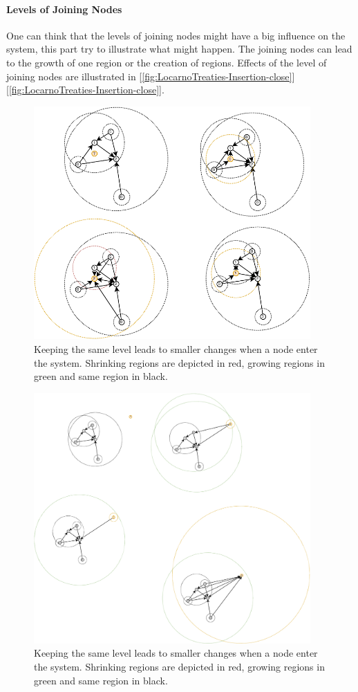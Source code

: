 \documentclass[a4paper,11pt,oneside]{report}
\begin{document}
\paragraph{Levels of Joining Nodes}
One can think that the levels of joining nodes might have a big influence on the
system, this part try to illustrate what might happen.  The joining nodes can
lead to the growth of one region or the creation
of regions. Effects of the level of joining nodes are illustrated in [\autoref{fig:LocarnoTreaties-Insertion-close}][\autoref{fig:LocarnoTreaties-Insertion-close}].

\begin{figure}[!h] 
\centering
\includegraphics[width=300pt]{figures/LocarnoTreaties-Insertion-close}
\caption{Keeping the same level leads to smaller changes when a node enter the
    system. Shrinking regions are depicted in red, growing regions in green and
    same region in black.} \label{fig:LocarnoTreaties-Insertion-close}
\end{figure}

\begin{figure}[!h] 
\centering
\includegraphics[width=300pt]{figures/LocarnoTreaties-Insertion-far}
\caption{Keeping the same level leads to smaller changes when a node enter the
    system. Shrinking regions are depicted in red, growing regions in green and
    same region in black.} \label{fig:LocarnoTreaties-Insertion-far}
\end{figure}
\end{document}
